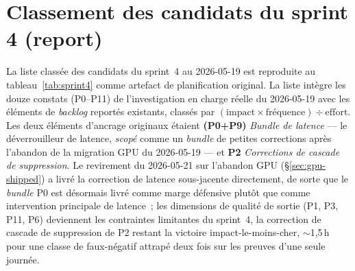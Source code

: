 \documentclass[11pt,a4paper,oneside]{report}
\begin{document}
\section{Classement des candidats du sprint 4 (report)}

La liste classée des candidats du sprint~4 au 2026-05-19 est
reproduite au tableau~\ref{tab:sprint4} comme artefact de
planification original. La liste intègre les douze constats
(P0--P11) de l'investigation en charge réelle du 2026-05-19 avec
les éléments de \emph{backlog} reportés existants, classés par
$(\text{impact}\times\text{fréquence})\div\text{effort}$. Les deux
éléments d'ancrage originaux étaient \textbf{(P0+P9)}
\emph{Bundle de latence} --- le déverrouilleur de latence,
\emph{scopé} comme un \emph{bundle} de petites corrections après
l'abandon de la migration GPU du 2026-05-19 --- et \textbf{P2}
\emph{Corrections de cascade de suppression}. Le revirement du
2026-05-21 sur l'abandon GPU (\S\ref{sec:gpu-shipped}) a livré la
correction de latence sous-jacente directement, de sorte que le
\emph{bundle} P0 est désormais livré comme marge défensive plutôt
que comme intervention principale de latence~; les dimensions de
qualité de sortie (P1, P3, P11, P6) deviennent les contraintes
limitantes du sprint~4, la correction de cascade de suppression de
P2 restant la victoire impact-le-moins-cher, $\sim$1,5\,h pour une
classe de faux-négatif attrapé deux fois sur les preuves d'une
seule journée.
\end{document}
